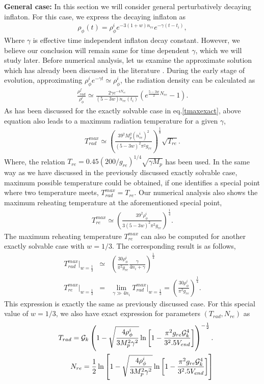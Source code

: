 \documentclass[prl,twocolumn,superscriptaddress,doublespace]{revtex4}%
\def\bea{\begin{eqnarray}}
\def\eea{\end{eqnarray}}
\def\nno{\nonumber}
\begin{document}
{\bf General case:} 
In this section we will consider general perturbatively decaying inflaton. For this case, 
we express the decaying inflaton as
\bea
\rho_{\phi}(t) =  \rho^i_{\phi} e^{-3(1+w)n_{re}} e^{- \gamma (t-t_i)} ,
\eea 
Where $\gamma$ is effective time independent inflaton decay constant. However, we believe our conclusion will remain same for time dependent $\gamma$, which we will study later. 
Before numerical analysis, let us examine the approximate solution
which has already been discussed in the literature \cite{tmax}.
During the early stage of evolution, approximating
$\rho_{\phi}^i e^{-\gamma t}\simeq \rho_{\phi}^i$, the radiation density can be calculated as
\bea
 \frac{\rho^f_{rad}}{\rho^i_{\phi}} \simeq
 \frac {2\gamma e^{-4 N_{re}}}{(5-3w)\dot{n}_{re}(t_i)}\left(e^{\frac{5-3w}{2}N_{re}} - 1 \right) .
 \eea
As has been discussed for the exactly solvable case in eq.\ref{tmaxexact}, above equation also leads to a maximum radiation temperature \cite{tmax} for a given $\gamma$,
\bea \label{tmax}
T_{rad}^{max} \simeq \left(\frac {39^2 M_p^2  (\dot{n}^i_{re})^2}{(5-3w)^2 \pi^2 g_{re}} \right)^{\frac 1 8} \sqrt{T_{re}} .
\eea
Where, the relation $T_{re}= 0.45 \left({200}/{g_{re}}\right)^{1/4}\sqrt{\gamma M_p}$ has been used. In the same way as we have discussed in the previously discussed exactly solvable case, maximum possible temperature could be obtained, if one identifies a special point where two temperature meets, $T_{rad}^{max} = T_{re}$. 
 Our numerical analysis also shows the maximum reheating temperature at the aforementioned special point, 
\bea
T_{re}^{max} \simeq \left(\frac {39^2  \rho^i_{\phi}}{3(5-3w)^2 \pi^2 g_{re}} \right)^{\frac 1 4}.
\eea
The maximum reheating temperature $T_{re}^{max}$ can also be computed for another exactly solvable case with $w=1/3$. The corresponding result is as follows,   
\bea \label{tmaxw13}
T_{rad}^{max}|_{w=\frac 1 3} &\simeq&  \left(\frac {30 \rho_{\phi}^i  }{ \pi^2 g_{re}} \frac {\gamma}{4 \dot{n}_i + \gamma} \right)^{\frac 1 4} \\\nno
T_{re}^{max}|_{w=\frac 1 3} & =& \lim_{\gamma\gg 4 \dot{n}_i}T_{rad}^{max}|_{w=\frac 1 3} = \left(\frac {30 \rho_{\phi}^i  }{ \pi^2 g_{re}} \right)^{\frac 1 4} .
\eea
This expression is exactly the same as previously discussed  case. For this special value of $w=1/3$, we also have exact expression for parameters $(T_{rad}, N_{re})$ as
\begin{eqnarray} \label{nretrerad}
&& T_{rad} = {\cal G}_k\left(1-\sqrt{\frac{4\rho^i_{\phi}}{3 M_p^2 \gamma^2}} \ln\left[1 - \frac{\pi^2g_{re} {\cal G}_k^4}{3^2.5V_{end} }\right]
 \right)^{-\frac 1 2 }. \\
&& N_{re} = \frac {1}{2}\ln \left[1-\sqrt{\frac{4\rho^i_{\phi}}{3 M_p^2 \gamma^2}} \ln\left[1 - \frac{\pi^2g_{re} {\cal G}_k^4}{3^2.5V_{end} }\right]\right]
\label{nretre}
\end{eqnarray}
\end{document}
